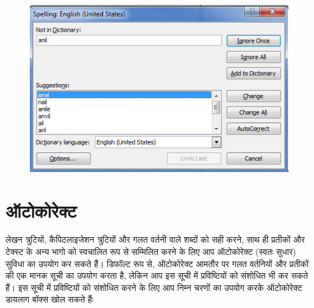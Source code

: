 \begin{figure}[H]
\centering
\includegraphics[scale=0.68]{src/images/chapter1/chapter1_fig64.png}
\end{figure}
					
\section{ऑटोकोरेक्ट}\label{id-1.40}

लेखन त्रुटियों, कैपिटलाइजेशन त्रुटियों और गलत वर्तनी वाले शब्दों को सही करने, साथ ही प्रतीकों और टेक्स्ट के अन्य भागो को स्वचालित रूप से सम्मिलित करने के लिए आप ऑटोकोरेक्ट  (स्वतः सुधार) सुविधा का उपयोग कर सकते हैं। डिफॉल्ट रूप से, ऑटोकोरेक्ट आमतौर पर गलत वर्तनियों और प्रतीकों की एक मानक सूची का उपयोग करता है, लेकिन आप इस सूची में प्रविष्टियों को संशोधित भी कर सकते हैं। इस सूची में प्रविष्टियों को संशोधित करने के लिए आप निम्न चरणों का उपयोग करके ऑटोकोरेक्ट डायलाग बॉक्स खोल सकते हैंः

